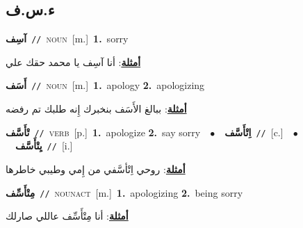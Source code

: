 \documentclass[10pt,a4paper,twoside]{article} %
\begin{document}
\begin{multicols}{2}
\vspace{-3mm}
\subsection*{\color{blue}\foreignlanguage{arabic}{ء.س.ف}\color{blue}{}} 

{\setlength\topsep{0pt}\textbf{\foreignlanguage{arabic}{آسِف}}\ {\color{gray}\texttt{//}\color{black}}\ \textsc{noun}\ [m.]\ \textbf{1.}~sorry\  \begin{flushright}\color{gray}\foreignlanguage{arabic}{\textbf{\underline{\foreignlanguage{arabic}{أمثلة}}}: أنا آسِف يا محمد حقك علي}\end{flushright}\color{black}} \vspace{2mm}

{\setlength\topsep{0pt}\textbf{\foreignlanguage{arabic}{أَسَف}}\ {\color{gray}\texttt{//}\color{black}}\ \textsc{noun}\ [m.]\ \textbf{1.}~apology  \textbf{2.}~apologizing\  \begin{flushright}\color{gray}\foreignlanguage{arabic}{\textbf{\underline{\foreignlanguage{arabic}{أمثلة}}}: ببالغ الأَسَف بنخبرك إِنه طلبك تم رفضه}\end{flushright}\color{black}} \vspace{2mm}

{\setlength\topsep{0pt}\textbf{\foreignlanguage{arabic}{تْأَسَّف}}\ {\color{gray}\texttt{//}\color{black}}\ \textsc{verb}\ [p.]\ \textbf{1.}~apologize  \textbf{2.}~say sorry\ \ $\bullet$\ \ \setlength\topsep{0pt}\textbf{\foreignlanguage{arabic}{اِتْأَسَّف}}\ {\color{gray}\texttt{//}\color{black}}\ [c.]\ \ $\bullet$\ \ \setlength\topsep{0pt}\textbf{\foreignlanguage{arabic}{يِتْأَسَّف}}\ {\color{gray}\texttt{//}\color{black}}\ [i.]\  \begin{flushright}\color{gray}\foreignlanguage{arabic}{\textbf{\underline{\foreignlanguage{arabic}{أمثلة}}}: روحي اِتْأسَّفي من إِمي وطيبي خاطرها}\end{flushright}\color{black}} \vspace{2mm}

{\setlength\topsep{0pt}\textbf{\foreignlanguage{arabic}{مِتْأَسِّف}}\ {\color{gray}\texttt{//}\color{black}}\ \textsc{noun\textunderscore act}\ [m.]\ \textbf{1.}~apologizing  \textbf{2.}~being sorry\  \begin{flushright}\color{gray}\foreignlanguage{arabic}{\textbf{\underline{\foreignlanguage{arabic}{أمثلة}}}: أنا مِتْأَسِّف عاللي صارلك}\end{flushright}\color{black}} \vspace{2mm}


\end{multicols}
\end{document}
